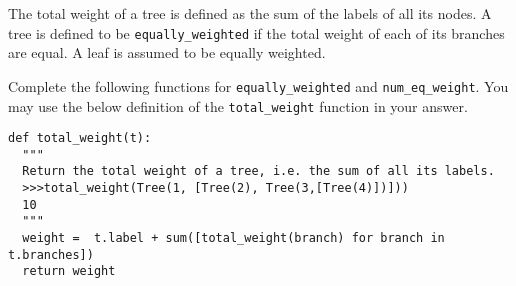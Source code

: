 \question 
The total weight of a tree is defined as the sum of the labels of all its nodes. A tree is defined to be \lstinline{equally_weighted} if the total weight of each of its branches are equal. A leaf is assumed to be equally weighted.

Complete the following functions for \lstinline{equally_weighted} and \lstinline{num_eq_weight}. You may use the below definition of the \lstinline{total_weight} function in your answer.

\begin{lstlisting}
def total_weight(t):
  """
  Return the total weight of a tree, i.e. the sum of all its labels.
  >>>total_weight(Tree(1, [Tree(2), Tree(3,[Tree(4)])]))
  10
  """
  weight =  t.label + sum([total_weight(branch) for branch in t.branches])
  return weight
\end{lstlisting}
\vspace{1\baselineskip}
